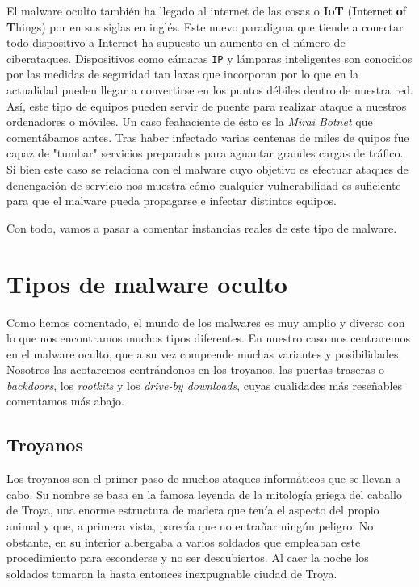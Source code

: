 \documentclass[12pt]{article}
\newcommand{\newpar} {
    \vskip 1cm
}
\begin{document}
            \newpar

            El malware oculto también ha llegado al internet de las cosas o \textbf{IoT} (\textbf{I}nternet \textbf{o}f \textbf{T}hings) por en sus siglas en inglés. Este nuevo paradigma que tiende a conectar todo dispositivo a Internet ha supuesto un aumento en el número de ciberataques. Dispositivos como cámaras \texttt{IP} y lámparas inteligentes son conocidos por las medidas de seguridad tan laxas que incorporan por lo que en la actualidad pueden llegar a convertirse en los puntos débiles dentro de nuestra red. Así, este tipo de equipos pueden servir de puente para realizar ataque a nuestros ordenadores o móviles. Un caso feahaciente de ésto es la \textit{Mirai Botnet} que comentábamos antes. Tras haber infectado varias centenas de miles de quipos fue capaz de "tumbar" servicios preparados para aguantar grandes cargas de tráfico. Si bien este caso se relaciona con el malware cuyo objetivo es efectuar ataques de denengación de servicio nos muestra cómo cualquier vulnerabilidad es suficiente para que el malware pueda propagarse e infectar distintos equipos.

            \newpar

            Con todo, vamos a pasar a comentar instancias reales de este tipo de malware.

    \section{Tipos de malware oculto}
        Como hemos comentado, el mundo de los malwares es muy amplio y diverso con lo que nos encontramos muchos tipos diferentes. En nuestro caso nos centraremos en el malware oculto, que a su vez comprende muchas variantes y posibilidades. Nosotros las acotaremos centrándonos en los troyanos, las puertas traseras o \textit{backdoors}, los \textit{rootkits} y los \textit{drive-by downloads}, cuyas cualidades más reseñables comentamos más abajo.

        \subsection{Troyanos}
            Los troyanos son el primer paso de muchos ataques informáticos que se llevan a cabo. Su nombre se basa en la famosa leyenda de la mitología griega del caballo de Troya, una enorme estructura de madera que tenía el aspecto del propio animal y que, a primera vista, parecía que no entrañar ningún peligro. No obstante, en su interior albergaba a varios soldados que empleaban este procedimiento para esconderse y no ser descubiertos. Al caer la noche los soldados tomaron la hasta entonces inexpugnable ciudad de Troya.
\end{document}
